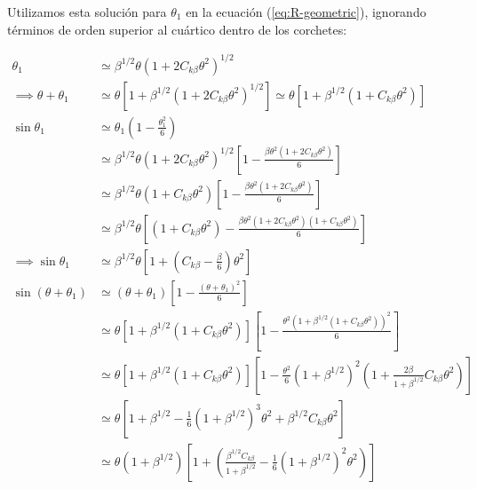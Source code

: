 Utilizamos esta solución para $\theta_1$ en la ecuación (\ref{eq:R-geometric}), ignorando términos de orden superior al cuártico
dentro de los corchetes:

\begin{align}
  \theta_1 &\simeq \beta^{1/2}\theta\left(1 + 2C_{k\beta}\theta^2\right)^{1/2} \\
  \implies \theta + \theta_1 &\simeq \theta\left[1 + \beta^{1/2}\left(1 + 2C_{k\beta}\theta^2\right)^{1/2}\right]
  \simeq \theta\left[1 + \beta^{1/2}\left(1 + C_{k\beta}\theta^2\right)\right]\\ 
  \sin\theta_1 &\simeq \theta_1\left(1 - \frac{\theta^2_1}{6}\right) \\
  &\simeq \beta^{1/2}\theta\left(1 + 2C_{k\beta}\theta^2\right)^{1/2}\left[1 - \frac{\beta\theta^2\left(1 + 2C_{k\beta}\theta^2\right)}{6}\right]\\
  &\simeq \beta^{1/2}\theta\left(1 + C_{k\beta}\theta^2\right)\left[1 - \frac{\beta\theta^2\left(1 + 2C_{k\beta}\theta^2\right)}{6}\right]\\
           &\simeq \beta^{1/2}\theta\left[\left(1 + C_{k\beta}\theta^2\right) - \frac{\beta\theta^2\left(1 + 2C_{k\beta}\theta^2\right)
             \left(1 + C_{k\beta}\theta^2\right)}{6}\right]\\
  \implies \sin\theta_1 &\simeq \beta^{1/2}\theta\left[1 + \left(C_{k\beta}- \frac{\beta}{6}\right)\theta^2\right] \\
  \sin\left(\theta + \theta_1 \right) &\simeq \left(\theta + \theta_1\right)\left[1 - \frac{\left(\theta + \theta_1\right)^2}{6}\right] \\
           &\simeq \theta\left[1 + \beta^{1/2}\left(1 + C_{k\beta}\theta^2\right)\right] \left[1 - \frac{\theta^2\left(1 + \beta^{1/2}
             \left(1 + C_{k\beta}\theta^2\right)\right)^2}{6}\right] \\
           &\simeq \theta\left[1 + \beta^{1/2}\left(1+ C_{k\beta}\theta^2\right)\right]\left[1 - \frac{\theta^2}{6}\left(1 + \beta^{1/2}\right)^2
             \left(1 + \frac{2\beta}{1 + \beta^{1/2}}C_{k\beta}\theta^2\right)\right] \\
           &\simeq \theta\left[1 + \beta^{1/2} - \frac{1}{6}\left(1+\beta^{1/2}\right)^3\theta^2 + \beta^{1/2}C_{k\beta}\theta^2\right] \\
           &\simeq \theta\left(1 + \beta^{1/2}\right)\left[1 + \left(\frac{\beta^{1/2}C_{k\beta}}{1 + \beta^{1/2}} - \frac{1}{6}\left(1 + \beta^{1/2}\right)^2
             \theta^2\right)\right]\\

\end{align}
